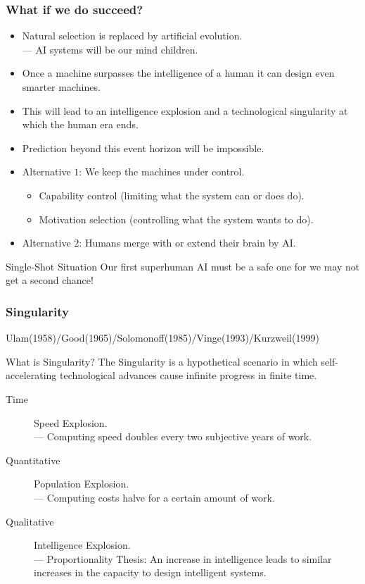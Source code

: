 \documentclass[UTF8,11pt,colorlinks,compress,openany]{beamer}%
\begin{document}
\begin{frame}\frametitle{What if we do succeed?}
\begin{itemize}
	\item Natural selection is replaced by artificial evolution.\\
	--- AI systems will be our mind children.
	\item Once a machine surpasses the intelligence of a human it can design even smarter machines.
	\item This will lead to an intelligence explosion and a technological singularity at which the human era ends.
	\item Prediction beyond this event horizon will be impossible.
	\item Alternative $1$: We keep the machines under control.
		\begin{itemize}
			\item Capability control (limiting what the system can or does do).
			\item Motivation selection (controlling what the system wants to do).
		\end{itemize}
	\item Alternative $2$: Humans merge with or extend their brain by AI.
\end{itemize}
\begin{block}{Single-Shot Situation}
Our first superhuman AI must be a safe one for we may not get a second chance!
\end{block}
\end{frame}

\begin{frame}\frametitle{Singularity}
\centerline{Ulam(1958)/Good(1965)/Solomonoff(1985)/Vinge(1993)/Kurzweil(1999)}
\begin{block}{What is Singularity?}
The Singularity is a hypothetical scenario in which self-accelerating technological advances cause infinite progress in finite time.
\end{block}
\begin{description}
	\item[Time] Speed Explosion.\\
	--- Computing speed doubles every two subjective years of work.
	\item[Quantitative] Population Explosion.\\
	--- Computing costs halve for a certain amount of work.
	\item[Qualitative] Intelligence Explosion.\\
	--- Proportionality Thesis: An increase in intelligence leads to similar increases in the capacity to design intelligent systems.
\end{description}
\end{frame}
\end{document}
